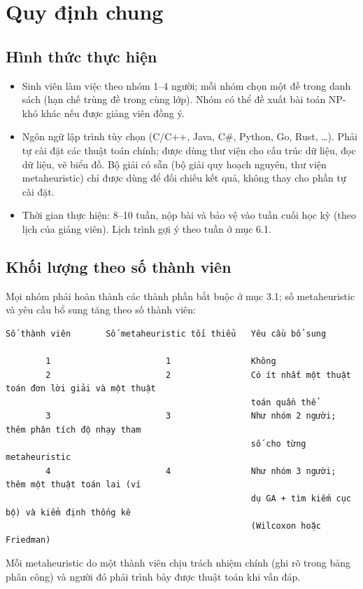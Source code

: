 \documentclass[a4paper,11pt]{article}
\begin{document}
\section{Quy định chung}
\subsection{Hình thức thực hiện}
\begin{itemize}
\item Sinh viên làm việc theo nhóm 1–4 người; mỗi nhóm chọn một đề trong danh sách (hạn chế trùng đề trong cùng lớp). Nhóm có thể đề xuất bài toán NP-khó khác nếu được giảng viên đồng ý.
\item Ngôn ngữ lập trình tùy chọn (C/C++, Java, C\#, Python, Go, Rust, …). Phải tự cài đặt các thuật toán chính; được dùng thư viện cho cấu trúc dữ liệu, đọc dữ liệu, vẽ biểu đồ. Bộ giải có sẵn (bộ giải quy hoạch nguyên, thư viện metaheuristic) chỉ được dùng để đối chiếu kết quả, không thay cho phần tự cài đặt.
\item Thời gian thực hiện: 8–10 tuần, nộp bài và bảo vệ vào tuần cuối học kỳ (theo lịch của giảng viên). Lịch trình gợi ý theo tuần ở mục 6.1.
\end{itemize}
\subsection{Khối lượng theo số thành viên}
Mọi nhóm phải hoàn thành các thành phần bắt buộc ở mục 3.1; số metaheuristic và yêu cầu bổ sung tăng theo số thành viên:

\begin{Verbatim}[fontsize=\tiny,breaklines=true,breakanywhere=true]
Số thành viên       Số metaheuristic tối thiểu   Yêu cầu bổ sung

        1                       1                Không
        2                       2                Có ít nhất một thuật toán đơn lời giải và một thuật
                                                 toán quần thể
        3                       3                Như nhóm 2 người; thêm phân tích độ nhạy tham
                                                 số cho từng metaheuristic
        4                       4                Như nhóm 3 người; thêm một thuật toán lai (ví
                                                 dụ GA + tìm kiếm cục bộ) và kiểm định thống kê
                                                 (Wilcoxon hoặc Friedman)

\end{Verbatim}
Mỗi metaheuristic do một thành viên chịu trách nhiệm chính (ghi rõ trong bảng phân công) và người đó phải trình bày được thuật toán khi vấn đáp.
\end{document}
